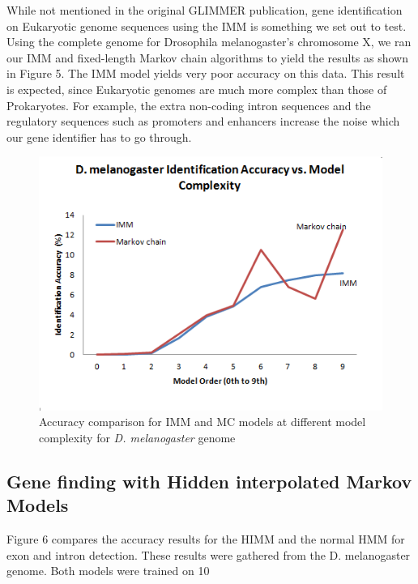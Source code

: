 \documentclass[11pt,letterpaper]{article}
\begin{document}
While not mentioned in the original GLIMMER publication, gene identification on Eukaryotic genome sequences using the IMM is something we set out to test. Using the complete genome for Drosophila melanogaster’s chromosome X, we ran our IMM and fixed-length Markov chain algorithms to yield the results as shown in Figure 5. The IMM model yields very poor accuracy on this data. This result is expected, since Eukaryotic genomes are much more complex than those of Prokaryotes. For example, the extra non-coding intron sequences and the regulatory sequences such as promoters and enhancers increase the noise which our gene identifier has to go through. 

\begin{figure}
	\begin{center}
		\includegraphics[scale=0.8]{plots/accuracy_vs_model_complexity_drosophila.png}
	\end{center}
	\caption{\label{font-table} Accuracy comparison for IMM and MC models at different model complexity for \emph{D. melanogaster} genome}
\end{figure}


\subsection{Gene finding with Hidden interpolated Markov Models}

Figure 6 compares the accuracy results for the HIMM and the normal HMM for exon and intron detection. These results were gathered from the D. melanogaster genome. Both models were trained on 10%
\end{document}
